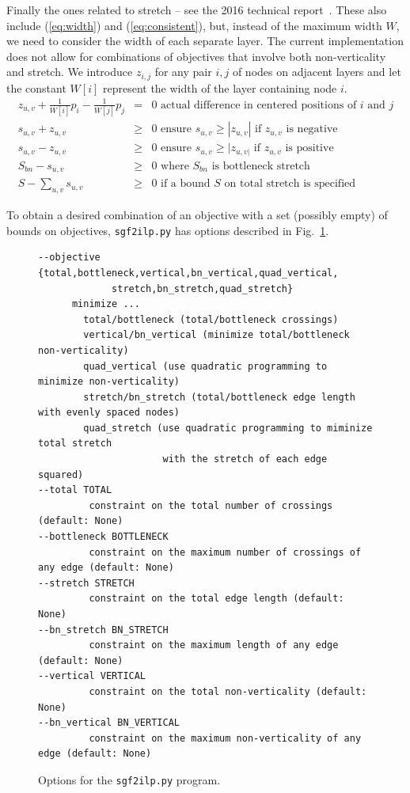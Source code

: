 Finally the ones related to stretch -- see the 2016 technical report~\cite{2016-TR_Stretch-Stallmann}. These also include (\ref{eq:width}) and (\ref{eq:consistent}), but, instead of the maximum width $W$, we need to consider the width of each separate layer. The current implementation does not allow for combinations of objectives that involve both non-verticality and stretch.
We introduce $z_{i,j}$ for any pair $i,j$ of nodes on adjacent layers and let the constant $W[i]$ represent the width of the layer containing node $i$.
\begin{eqnarray}
  z_{u,v} + \frac{1}{W[i]} p_i - \frac{1}{W[j]} p_j &=& 0 \mbox{ actual difference in centered positions of $i$ and $j$} \label{eq:diff}
  \\
  s_{u,v} + z_{u,v} &\geq& 0 \mbox{ ensure $s_{u,v} \geq |z_{u,v}|$ if $z_{u,v}$ is negative} \label{eq:pos_diff} 
  \\  
  s_{u,v} - z_{u,v} &\geq& 0 \mbox{ ensure $s_{u,v} \geq |z_{u,v|}$ if $z_{u,v}$ is positive} \label{eq:neg_diff}
  \\
  S_{bn} - s_{u,v} &\geq& 0 \mbox{ where $S_{bn}$ is bottleneck stretch}
  \\
  S - \sum_{u,v} s_{u,v} &\geq& 0 \mbox{ if a bound $S$ on total stretch is specified} \label{eq:total_stretch}
\end{eqnarray}

To obtain a desired combination of an objective with a set (possibly empty) of bounds on objectives, \texttt{sgf2ilp.py} has options described in Fig.~\ref{fig:options}.

\begin{figure}
\small
\begin{verbatim}
--objective {total,bottleneck,vertical,bn_vertical,quad_vertical,
             stretch,bn_stretch,quad_stretch}
      minimize ...
        total/bottleneck (total/bottleneck crossings)
        vertical/bn_vertical (minimize total/bottleneck non-verticality)
        quad_vertical (use quadratic programming to minimize non-verticality)
        stretch/bn_stretch (total/bottleneck edge length with evenly spaced nodes)
        quad_stretch (use quadratic programming to miminize total stretch
                      with the stretch of each edge squared)
--total TOTAL
         constraint on the total number of crossings (default: None)
--bottleneck BOTTLENECK
         constraint on the maximum number of crossings of any edge (default: None)
--stretch STRETCH
         constraint on the total edge length (default: None)
--bn_stretch BN_STRETCH
         constraint on the maximum length of any edge (default: None)
--vertical VERTICAL
         constraint on the total non-verticality (default: None)
--bn_vertical BN_VERTICAL
         constraint on the maximum non-verticality of any edge (default: None)
\end{verbatim}

\caption{Options for the \texttt{sgf2ilp.py} program.}
\label{fig:options}
\end{figure}

